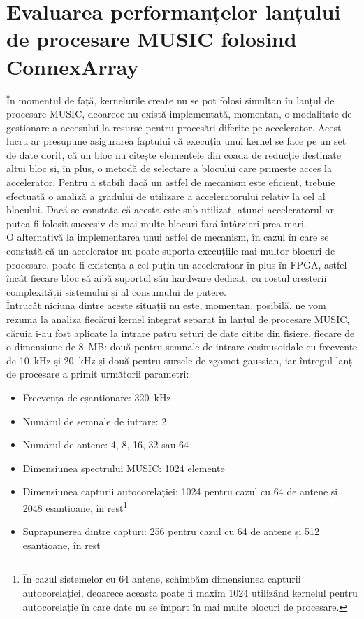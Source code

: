 \section{Evaluarea performanțelor lanțului de procesare MUSIC folosind ConnexArray}
\label{sec:eval-music-chain}

În momentul de față, kernelurile create nu se pot folosi simultan în lanțul de
procesare MUSIC, deoarece nu există implementată, momentan, o modalitate de
gestionare a accesului la resurse pentru procesări diferite pe accelerator.
Acest lucru ar presupune asigurarea faptului că execuția unui kernel se face pe
un set de date dorit, că un bloc nu citește elementele din coada de
reducție destinate altui bloc și, în plus, o metodă de selectare a blocului care
primește acces la accelerator. Pentru a stabili dacă un astfel de mecanism este
eficient, trebuie efectuată o analiză a gradului de utilizare a acceleratorului
relativ la cel al blocului. Dacă se constată că acesta este sub-utilizat, atunci
acceleratorul ar putea fi folosit succesiv de mai multe blocuri fără
întârzieri prea mari. \\

O alternativă la implementarea unui astfel de mecanism, în cazul în care se
constată că un accelerator nu poate suporta execuțiile mai multor blocuri de
procesare, poate fi existența a cel puțin un acceleratoar în plus în FPGA,
astfel încât fiecare bloc să aibă suportul său hardware dedicat, cu costul
creșterii complexității sistemului și al consumului de putere. \\

Întrucât niciuna dintre aceste situații nu este, momentan, posibilă, ne vom
rezuma la analiza fiecărui kernel integrat separat în lanțul de procesare MUSIC,
căruia i-au fost aplicate la intrare patru seturi de date citite din fișiere,
fiecare de o dimensiune de \SI{8}{MB}: două pentru semnale de intrare
cosinusoidale cu frecvențe de \SI{10}{kHz} și \SI{20}{kHz} și două pentru
sursele de zgomot gaussian, iar întregul lanț de procesare a primit următorii
parametri:
\begin{itemize}
  \item Frecvența de eșantionare: \SI{320}{kHz}
  \item Numărul de semnale de intrare: 2
  \item Numărul de antene: 4, 8, 16, 32 sau 64
  \item Dimensiunea spectrului MUSIC: 1024 elemente
  \item Dimensiunea capturii autocorelației: 1024 pentru cazul cu 64 de antene
  și 2048 eșantioane, în rest\footnote{În cazul sistemelor cu 64 antene,
  schimbăm dimensiunea capturii autocorelației, deoarece aceasta poate fi maxim
  1024 utilizând kernelul pentru autocorelație în care date nu se împart în mai
  multe blocuri de procesare.}
  \item Suprapunerea dintre capturi: 256 pentru cazul cu 64 de antene și 512
  eșantioane, în rest
\end{itemize}


